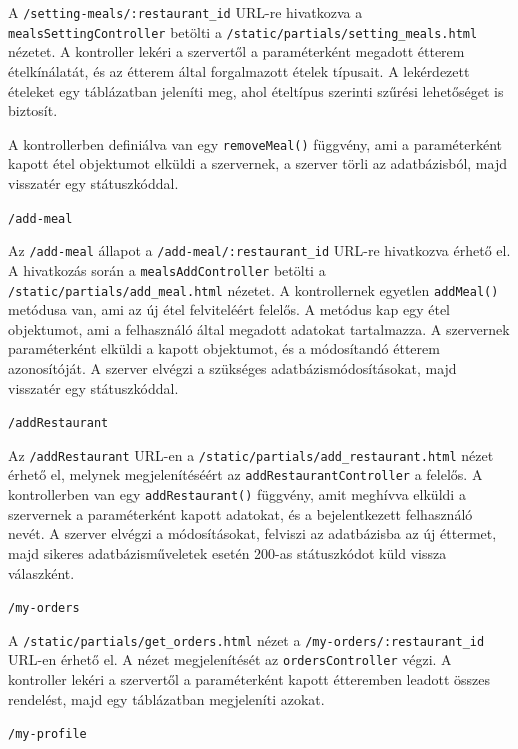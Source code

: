 A \texttt{/setting-meals/:restaurant\_id} URL-re hivatkozva a \texttt{mealsSettingController} betölti a \texttt{/static/partials/setting\_meals.html} nézetet. A kontroller lekéri a szervertől a paraméterként megadott étterem ételkínálatát, és az étterem által forgalmazott ételek típusait. A lekérdezett ételeket egy táblázatban jeleníti meg, ahol ételtípus szerinti szűrési lehetőséget is biztosít.

A kontrollerben definiálva van egy \texttt{removeMeal()} függvény, ami a paraméterként kapott étel objektumot elküldi a szervernek, a szerver törli az adatbázisból, majd visszatér egy státuszkóddal.

\bigskip

\noindent \texttt{/add-meal}

Az \texttt{/add-meal} állapot a \texttt{/add-meal/:restaurant\_id} URL-re hivatkozva érhető el. A hivatkozás során a \texttt{mealsAddController} betölti a \texttt{/static/partials/add\_meal.html} nézetet. A kontrollernek egyetlen \texttt{addMeal()} metódusa van, ami az új étel felviteléért felelős. A metódus kap egy étel objektumot, ami a felhasználó által megadott adatokat tartalmazza. A szervernek paraméterként elküldi a kapott objektumot, és a módosítandó étterem azonosítóját. A szerver elvégzi a szükséges adatbázismódosításokat, majd visszatér egy státuszkóddal.

\bigskip

\noindent \texttt{/addRestaurant}

Az \texttt{/addRestaurant} URL-en a \texttt{/static/partials/add\_restaurant.html} nézet érhető el, melynek megjelenítéséért az \texttt{addRestaurantController} a felelős. A kontrollerben van egy \texttt{addRestaurant()} függvény, amit meghívva elküldi a szervernek a paraméterként kapott adatokat, és a bejelentkezett felhasználó nevét. A szerver elvégzi a módosításokat, felviszi az adatbázisba az új éttermet, majd sikeres adatbázisműveletek esetén 200-as státuszkódot küld vissza válaszként.

\bigskip

\noindent \texttt{/my-orders}

A \texttt{/static/partials/get\_orders.html} nézet a \texttt{/my-orders/:restaurant\_id} URL-en érhető el. A nézet megjelenítését az \texttt{ordersController} végzi. A kontroller lekéri a szervertől a paraméterként kapott étteremben leadott összes rendelést, majd egy táblázatban megjeleníti azokat.

\bigskip

\noindent \texttt{/my-profile}

